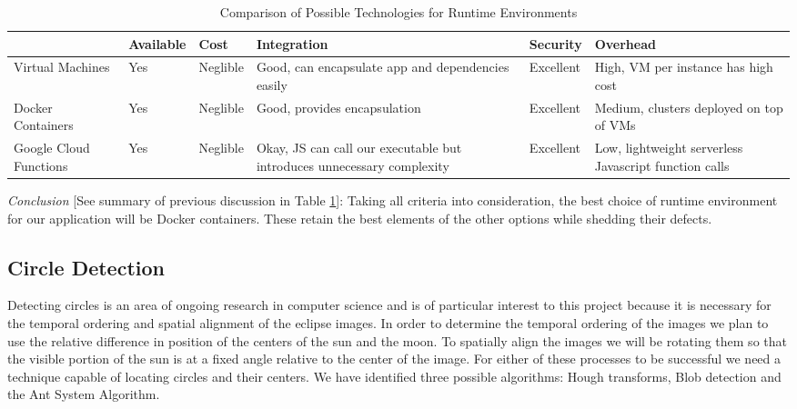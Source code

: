 \documentclass[10pt, onecolumn, draftclsnofoot, letterpaper, compsoc]{IEEEtran}
\begin{document}
\begin{table}[h]
\centering
\caption{Comparison of Possible Technologies for Runtime Environments}
\begin{tabular}{|p{2.1cm}|p{2.1cm}|p{2.1cm}|p{2.1cm}|p{2.1cm}|p{2.1cm}|}
\cline{4-4}

\hline  & Available & Cost & Integration & Security & Overhead \\ \hline

Virtual Machines & Yes & Neglible & Good, can encapsulate app and dependencies
easily &  Excellent & High, VM per instance has high cost  \\ \hline

Docker Containers  & Yes & Neglible & Good, provides encapsulation &  Excellent
& Medium, clusters deployed on top of VMs  \\ \hline

Google Cloud Functions  & Yes & Neglible & Okay, JS can call our executable but
introduces unnecessary complexity & Excellent & Low, lightweight serverless
Javascript function calls  \\ \hline

\end{tabular}
\label{table:george2}
\end{table}

\textit{Conclusion} [See summary of previous discussion in Table
\ref{table:george2}]: Taking all criteria into consideration, the best choice of runtime environment
for our application will be Docker containers. These retain the best elements of
the other options while shedding their defects. \\

\subsection{Circle Detection}

Detecting circles is an area of ongoing research in computer science and is of
particular interest to this project because it is necessary for the temporal
ordering and spatial alignment of the eclipse images. In order to determine the
temporal ordering of the images we plan to use the relative difference in
position of the centers of the sun and the moon. To spatially align the images
we will be rotating them so that the visible portion of the sun is at a fixed
angle relative to the center of the image. For either of these processes to be
successful we need a technique capable of locating circles and their centers. We
have identified three possible algorithms: Hough transforms, Blob detection and
the Ant System Algorithm. \\
\end{document}
